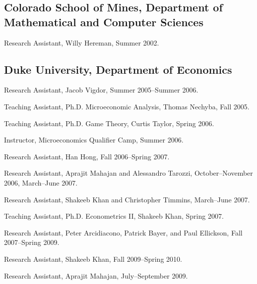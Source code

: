 \documentclass[10pt,letterpaper]{article}
\renewenvironment{itemize}{
  \begin{list}{}{
    \setlength{\leftmargin}{1.5em}
    \setlength{\itemsep}{0.25em}
    \setlength{\parskip}{0pt}
    \setlength{\parsep}{0.25em}
  }
}{
  \end{list}
}
\begin{document}
\subsection*{Colorado School of Mines,
  Department of Mathematical and Computer Sciences}

\begin{itemize}

\item Research Assistant, Willy Hereman, Summer 2002.

\end{itemize}

\subsection*{Duke University, Department of Economics}

\begin{itemize}

\item Research Assistant, Jacob Vigdor, Summer 2005--Summer 2006.

\item Teaching Assistant, Ph.D. Microeconomic Analysis, Thomas Nechyba,
  Fall 2005.

\item Teaching Assistant, Ph.D. Game Theory, Curtis Taylor,
  Spring 2006.

\item Instructor, Microeconomics Qualifier Camp, Summer 2006.

\item Research Assistant, Han Hong, Fall 2006--Spring 2007.

\item Research Assistant, Aprajit Mahajan and Alessandro Tarozzi,
  October--November 2006, March--June 2007.

\item Research Assistant, Shakeeb Khan and Christopher Timmins,
  March--June 2007.

\item Teaching Assistant, Ph.D. Econometrics II, Shakeeb Khan,
  Spring 2007.

\item Research Assistant, Peter Arcidiacono, Patrick Bayer,
  and Paul Ellickson, Fall 2007--Spring 2009.

\item Research Assistant, Shakeeb Khan, Fall 2009--Spring 2010.

\item Research Assistant, Aprajit Mahajan, July--September 2009.

\end{itemize}
\end{document}
